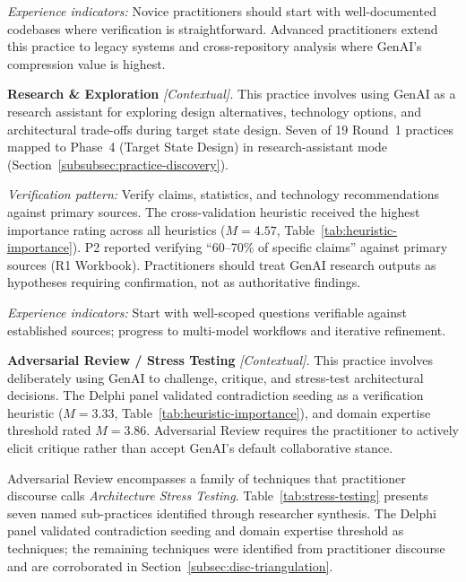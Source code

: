 \textit{Experience indicators:} Novice practitioners should start with
well-documented codebases where verification is straightforward. Advanced
practitioners extend this practice to legacy systems and cross-repository
analysis where GenAI's compression value is highest.

\textbf{Research \& Exploration} \textit{[Contextual].}
This practice involves using GenAI as a research assistant for exploring design
alternatives, technology options, and architectural trade-offs during target
state design. Seven of 19 Round~1 practices mapped to Phase~4 (Target State
Design) in research-assistant mode
(Section~\ref{subsubsec:practice-discovery}).

\textit{Verification pattern:} Verify claims, statistics, and technology
recommendations against primary sources. The cross-validation heuristic received
the highest importance rating across all heuristics ($M = 4.57$,
Table~\ref{tab:heuristic-importance}). P2 reported verifying ``60--70\% of
specific claims'' against primary sources (R1 Workbook). Practitioners should
treat GenAI research outputs as hypotheses requiring confirmation, not as
authoritative findings.

\textit{Experience indicators:} Start with well-scoped questions verifiable
against established sources; progress to multi-model workflows and iterative
refinement.

\textbf{Adversarial Review / Stress Testing} \textit{[Contextual].}
This practice involves deliberately using GenAI to challenge, critique, and
stress-test architectural decisions. The Delphi panel validated contradiction
seeding as a verification heuristic ($M = 3.33$,
Table~\ref{tab:heuristic-importance}), and domain expertise threshold rated
$M = 3.86$. Adversarial Review requires the practitioner to actively elicit
critique rather than accept GenAI's default collaborative stance.

Adversarial Review encompasses a family of techniques that practitioner discourse
calls \textit{Architecture Stress Testing}. Table~\ref{tab:stress-testing}
presents seven named sub-practices identified through researcher synthesis. The
Delphi panel validated contradiction seeding and domain expertise threshold as
techniques; the remaining techniques were identified from practitioner discourse
and are corroborated in Section~\ref{subsec:disc-triangulation}.

